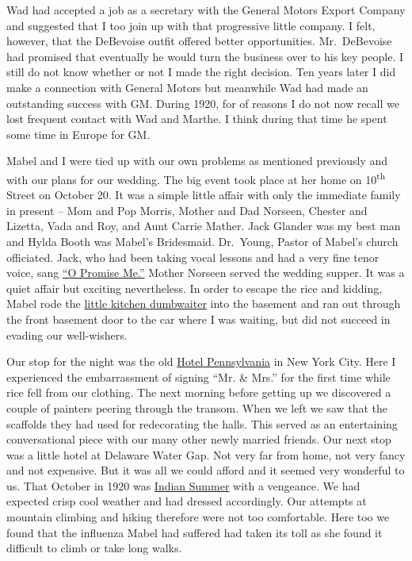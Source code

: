 \documentclass[12pt]{book}              %
\begin{document}
Wad had accepted a job as a secretary with the General Motors Export Company and suggested that I too join up with that progressive little company. I felt, however, that the DeBevoise outfit offered better opportunities. Mr.~DeBevoise had promised that eventually he would turn the business over to his key people. I still do not know whether or not I made the right decision. Ten years later I did make a connection with General Motors but meanwhile Wad had made an outstanding success with GM. During 1920, for of reasons I do not now recall we lost frequent contact with Wad and Marthe. I think during that time he spent some time in Europe for GM.

Mabel and I were tied up with our own problems as mentioned previously and with our plans for our wedding. The big event took place at her home on 10\textsuperscript{th} Street on October 20. It was a simple little affair with only the immediate family in present -- Mom and Pop Morris, Mother and Dad Norseen, Chester and Lizetta, Vada and Roy, and Aunt Carrie Mather. Jack Glander was my best man and Hylda Booth was Mabel's Bridesmaid. Dr.~Young, Pastor of Mabel's church officiated. Jack, who had been taking vocal lessons and had a very fine tenor voice, sang \href{http://en.wikipedia.org/wiki/Oh_Promise_Me}{``O Promise Me.''} Mother Norseen served the wedding supper. It was a quiet affair but exciting nevertheless. In order to escape the rice and kidding, Mabel rode the \href{http://en.wikipedia.org/wiki/Dumbwaiter_(elevator)}{little kitchen dumbwaiter} into the basement and ran out through the front basement door to the car where I was waiting, but did not succeed in evading our well-wishers. 

Our stop for the night was the old \href{http://en.wikipedia.org/wiki/Hotel_Pennsylvania}{Hotel Pennsylvania} in New York City. Here I experienced the embarrassment of signing ``Mr. \& Mrs.'' for the first time while rice fell from our clothing. The next morning before getting up we discovered a couple of painters peering through the transom. When we left we saw that the scaffolds they had used for redecorating the halls. This served as an entertaining conversational piece with our many other newly married friends. Our next stop was a little hotel at Delaware Water Gap. Not very far from home, not very fancy and not expensive. But it was all we could afford and it seemed very wonderful to us. That October in 1920 was \href{http://en.wikipedia.org/wiki/Indian_summer}{Indian Summer} with a vengeance. We had expected crisp cool weather and had dressed accordingly. Our attempts at mountain climbing and hiking therefore were not too comfortable. Here too we found that the influenza Mabel had suffered had taken its toll as she found it difficult to climb or take long walks.
\end{document}
